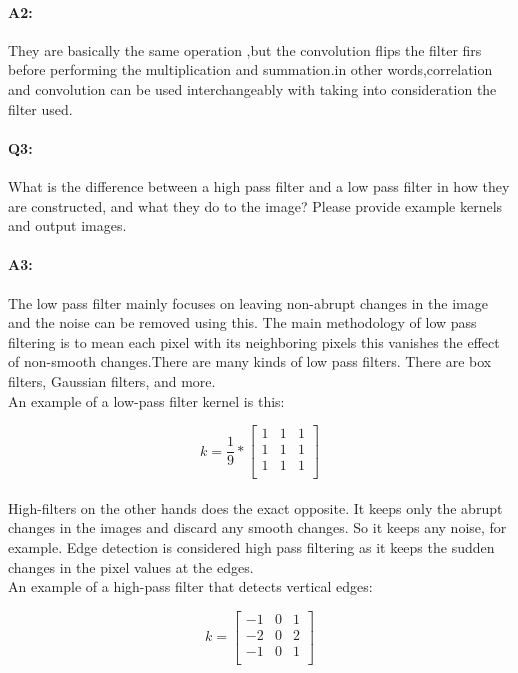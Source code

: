 \paragraph{A2:} They are basically the same operation ,but the convolution flips the filter firs before performing the multiplication and summation.in other words,correlation and convolution can be used interchangeably with taking into consideration the filter used.




\pagebreak
\paragraph{Q3:} What is the difference between a high pass filter and a low pass filter in how they are constructed, and what they do to the image? Please provide example kernels and output images.

\paragraph{A3:}
The low pass filter mainly focuses on leaving non-abrupt changes in the image and the noise can be removed using this. The main methodology of low pass filtering is to mean each pixel with its neighboring pixels this vanishes the effect of non-smooth changes.There are many kinds of low pass filters. There are box filters, Gaussian filters, and more.\\ An example of a low-pass filter kernel is this:

\[
k = \frac{1}{9} *
\begin{bmatrix}
1 & 1 & 1\\
1 & 1 & 1\\
1 & 1 & 1\\
\end{bmatrix}
\]\\

High-filters on the other hands does the exact opposite. It keeps only the abrupt changes in the images and discard any smooth changes. So it keeps any noise, for example. Edge detection is considered high pass filtering as it keeps the sudden changes in the pixel values at the edges.\\
An example of a high-pass filter that detects vertical edges:

\[
k = 
\begin{bmatrix}
-1 & 0 & 1\\
-2 & 0 & 2\\
-1 & 0 & 1\\
\end{bmatrix}
\]\\







